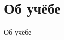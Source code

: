 \section{Об учёбе}

\begin{frame}
    \begin{center}\Huge 
    Об учёбе
    \end{center}
\end{frame}